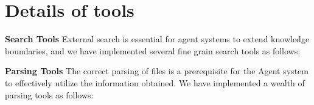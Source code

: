 \newpage
\beginappendix

\section{Details of tools}
\label{app:tools}

\noindent \textbf{Search Tools} 
External search is essential for agent systems to extend knowledge boundaries, and we have implemented several fine grain search tools as follows:


\noindent \textbf{Parsing Tools}
The correct parsing of files is a prerequisite for the Agent system to effectively utilize the information obtained. We have implemented a wealth of parsing tools as follows:


